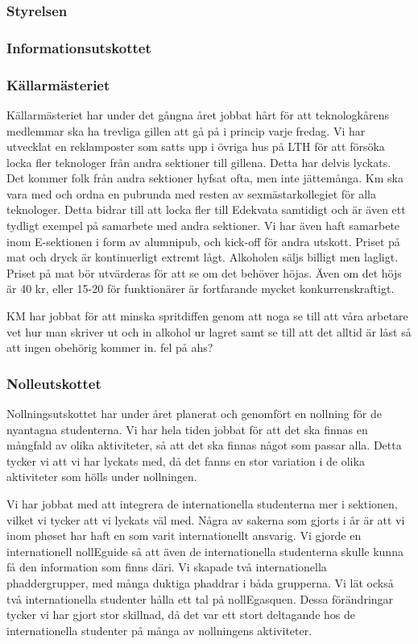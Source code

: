 \documentclass[../_main/handlingar.tex]{subfiles}
\begin{document}

\subsubsection*{Styrelsen}

\subsubsection*{Informationsutskottet}

\subsubsection*{Källarmästeriet}
Källarmästeriet har under det gångna året jobbat hårt för att teknologkårens medlemmar ska ha trevliga gillen att gå på i princip varje fredag. Vi har utvecklat en reklamposter som satts upp i övriga hus på LTH för att försöka locka fler teknologer från andra sektioner till gillena. Detta har delvis lyckats. Det kommer folk från andra sektioner hyfsat ofta, men inte jättemånga. 
Km ska vara med och ordna en pubrunda med resten av sexmästarkollegiet för alla teknologer. Detta bidrar till att locka fler till Edekvata samtidigt och är även ett tydligt exempel på samarbete med andra sektioner. Vi har även haft samarbete inom E-sektionen i form av alumnipub, och kick-off för andra utskott.
Priset på mat och dryck är kontinuerligt extremt lågt. Alkoholen säljs billigt men lagligt. Priset på mat bör utvärderas för att se om det behöver höjas. Även om det höjs är 40 kr, eller 15-20 för funktionärer är fortfarande mycket konkurrenskraftigt.

KM har jobbat för att minska spritdiffen genom att noga se till att våra arbetare vet hur man skriver ut och in alkohol ur lagret samt se till att det alltid är låst så att ingen obehörig kommer in. fel på ahs?

\subsubsection*{Nolleutskottet}
Nollningsutskottet har under året planerat och genomfört en nollning för de nyantagna studenterna. Vi har hela tiden jobbat för att det ska finnas en mångfald av olika aktiviteter, så att det ska finnas något som passar alla. Detta tycker vi att vi har lyckats med, då det fanns en stor variation i de olika aktiviteter som hölls under nollningen. 

Vi har jobbat med att integrera de internationella studenterna mer i sektionen, vilket vi tycker att vi lyckats väl med. Några av sakerna som gjorts i år är att vi inom phøset har haft en som varit internationellt ansvarig. Vi gjorde en internationell nollEguide så att även de internationella studenterna skulle kunna få den information som finns däri. Vi skapade två internationella phaddergrupper, med många duktiga phaddrar i båda grupperna. Vi lät också två internationella studenter hålla ett tal på nollEgasquen. Dessa förändringar tycker vi har gjort stor skillnad, då det var ett stort deltagande hos de internationella studenter på många av nollningens aktiviteter.
\end{document}
